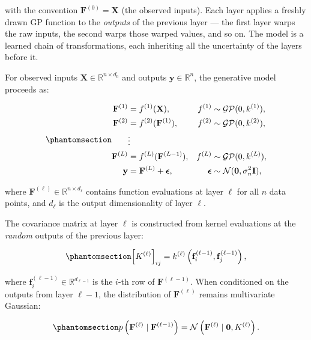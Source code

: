 \documentclass[
  letterpaper,
  DIV=11,
  numbers=noendperiod]{scrartcl}
\begin{document}
with the convention \(\mathbf{F}^{(0)} = \mathbf{X}\) (the observed
inputs). Each layer applies a freshly drawn GP function to the
\emph{outputs} of the previous layer --- the first layer warps the raw
inputs, the second warps those warped values, and so on. The model is a
learned chain of transformations, each inheriting all the uncertainty of
the layers before it.

For observed inputs \(\mathbf{X} \in \mathbb{R}^{n \times d_0}\) and
outputs \(\mathbf{y} \in \mathbb{R}^n\), the generative model proceeds
as:

\begin{equation}\phantomsection\label{eq-dgp_generative}{
\begin{aligned}
\mathbf{F}^{(1)} &= f^{(1)}(\mathbf{X}), & f^{(1)} &\sim \mathcal{GP}(0, k^{(1)}), \\
\mathbf{F}^{(2)} &= f^{(2)}(\mathbf{F}^{(1)}), & f^{(2)} &\sim \mathcal{GP}(0, k^{(2)}), \\
&\vdots \\
\mathbf{F}^{(L)} &= f^{(L)}(\mathbf{F}^{(L-1)}), & f^{(L)} &\sim \mathcal{GP}(0, k^{(L)}), \\
\mathbf{y} &= \mathbf{F}^{(L)} + \boldsymbol{\epsilon}, & \boldsymbol{\epsilon} &\sim \mathcal{N}(\mathbf{0}, \sigma_n^2 \mathbf{I}),
\end{aligned}
}\end{equation}

where \(\mathbf{F}^{(\ell)} \in \mathbb{R}^{n \times d_\ell}\) contains
function evaluations at layer \(\ell\) for all \(n\) data points, and
\(d_\ell\) is the output dimensionality of layer \(\ell\).

The covariance matrix at layer \(\ell\) is constructed from kernel
evaluations at the \emph{random} outputs of the previous layer:

\begin{equation}\phantomsection\label{eq-dgp_covariance_element}{
\left[K^{(\ell)}\right]_{ij} = k^{(\ell)}\left(\mathbf{f}_i^{(\ell-1)}, \mathbf{f}_j^{(\ell-1)}\right),
}\end{equation}

where \(\mathbf{f}_i^{(\ell-1)} \in \mathbb{R}^{d_{\ell-1}}\) is the
\(i\)-th row of \(\mathbf{F}^{(\ell-1)}\). When conditioned on the
outputs from layer \(\ell-1\), the distribution of
\(\mathbf{F}^{(\ell)}\) remains multivariate Gaussian:

\begin{equation}\phantomsection\label{eq-dgp_conditional_gaussian}{
p\left(\mathbf{F}^{(\ell)} \mid \mathbf{F}^{(\ell-1)}\right) = \mathcal{N}\left(\mathbf{F}^{(\ell)} \mid \mathbf{0}, K^{(\ell)}\right).
}\end{equation}
\end{document}
